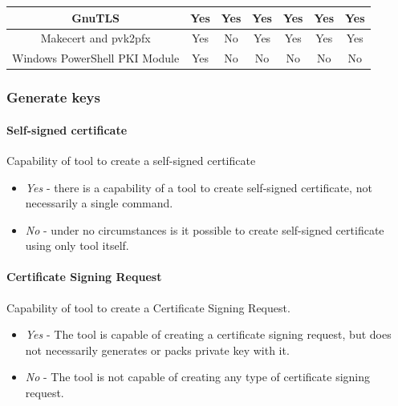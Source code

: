 \documentclass[10pt, a4paper]{report}
\begin{document}
\begin{table}[h!]
\begin{adjustbox}{max width=\textwidth}
\begin{tabular}{|c|c|c|c|c|c|c|}
GnuTLS                        & \cellcolor[HTML]{34FF34}Yes                                          & \cellcolor[HTML]{34FF34}Yes & \cellcolor[HTML]{34FF34}Yes & \cellcolor[HTML]{34FF34}Yes & \cellcolor[HTML]{34FF34}Yes & \cellcolor[HTML]{34FF34}Yes \\ \hline
Makecert and pvk2pfx          & \cellcolor[HTML]{34FF34}Yes					     & \cellcolor[HTML]{FE0000}No  & \cellcolor[HTML]{34FF34}Yes & \cellcolor[HTML]{FFC702}Yes & \cellcolor[HTML]{34FF34}Yes & \cellcolor[HTML]{34FF34}Yes \\ \hline
Windows PowerShell PKI Module & \cellcolor[HTML]{34FF34}Yes                                          & \cellcolor[HTML]{FE0000}No  & \cellcolor[HTML]{FE0000}No  & \cellcolor[HTML]{FE0000}No  & \cellcolor[HTML]{FE0000}No  & \cellcolor[HTML]{FE0000}No  \\ \hline
\end{tabular}
\end{adjustbox}
\end{table}

\subsubsection{Generate keys}

\paragraph{Self-signed certificate}
Capability of tool to create a self-signed certificate
\begin{itemize}
 \item \textit{Yes} - there is a capability of a tool to create self-signed certificate, not necessarily a single command.
 \item \textit{No} - under no circumstances is it possible to create self-signed certificate using only tool itself.
\end{itemize}

\paragraph{Certificate Signing Request}
Capability of tool to create a Certificate Signing Request.
\begin{itemize}
 \item \textit{Yes} - The tool is capable of creating a certificate signing request, but does not necessarily generates or packs private key with it.
 \item \textit{No} - The tool is not capable of creating any type of certificate signing request.
\end{itemize}
\end{document}
